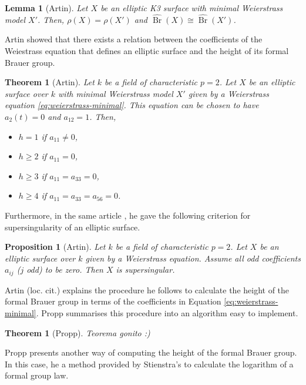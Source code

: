 \documentclass{report}
\DeclareMathOperator{\Br}{Br}
\newtheorem{theorem}[equation]{Theorem}
\newtheorem{proposition}[equation]{Proposition}
\newtheorem{lemma}[equation]{Lemma}
\theoremstyle{definition}
\begin{document}
\begin{lemma}[Artin]
Let $X$ be an elliptic K3 surface with minimal Weierstrass model $X'$. Then, $\rho(X)=\rho(X')$ and $\widehat{\Br}(X)\cong\widehat{\Br}(X')$.
\end{lemma}

Artin \cite[Theorem~2.12]{artin1974supersingular} showed that there exists a relation between the coefficients of the Weiestrass equation that defines an elliptic surface and the height of its formal Brauer group.

\begin{theorem}[Artin]
Let $k$ be a field of characteristic $p=2$. Let $X$ be an elliptic surface over $k$ with minimal Weierstrass model $X'$ given by a Weierstrass equation \eqref{eq:weierstrass-minimal}. This equation can be chosen to have $a_2(t)=0$ and $a_{12}=1$. Then,
\begin{itemize}
\item $h=1$ if $a_{11}\neq0$,
\item $h\geq2$ if $a_{11}=0$,
\item $h\geq3$ if $a_{11}=a_{33}=0$,
\item $h\geq4$ if $a_{11}=a_{33}=a_{56}=0$.
\end{itemize}
\end{theorem}

Furthermore, in the same article \cite[Proposition~2.13]{artin1974supersingular}, he gave the following criterion for supersingularity of an elliptic surface.

\begin{proposition}[Artin]
Let $k$ be a field of characteristic $p=2$. Let $X$ be an elliptic surface over $k$ given by a Weierstrass equation. Assume all odd coefficients $a_{ij}$ ($j$ odd) to be zero. Then $X$ is supersingular.
\end{proposition}

Artin (loc. cit.) explains the procedure he follows to calculate the height of the formal Brauer group in terms of the coefficients in Equation \eqref{eq:weierstrass-minimal}. Propp \cite[Theorem~7.1]{propp2018constructing} summarises this procedure into an algorithm easy to implement.

\begin{theorem}[Propp]
Teorema gonito :)
\end{theorem}

Propp \cite[Section~6]{propp2018constructing} presents another way of computing the height of the formal Brauer group. In this case, he a method provided by Stienstra's \cite[Theorem~1]{stienstra1987formal} to calculate the logarithm of a formal group law.
\end{document}
